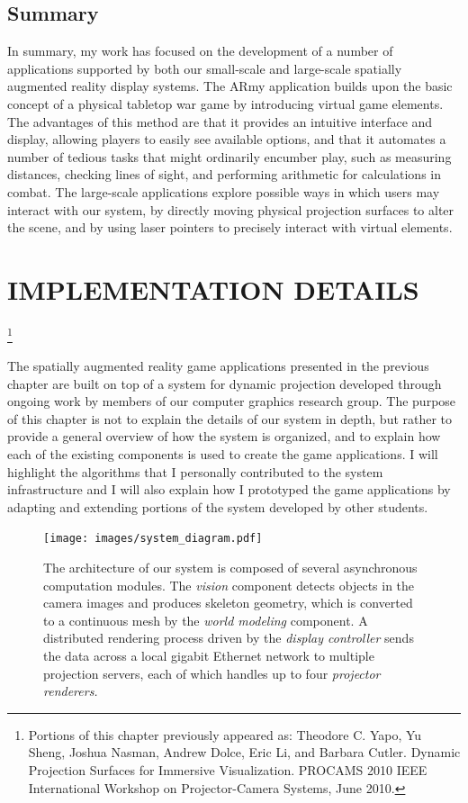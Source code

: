 \documentclass{thesis}
\begin{document}
\section{Summary}

In summary, my work has focused on the development of a number of applications supported by both our small-scale and large-scale spatially augmented reality display systems. The ARmy application builds upon the basic concept of a physical tabletop war game by introducing virtual game elements. The advantages of this method are that it provides an intuitive interface and display, allowing players to easily see available options, and that it automates a number of tedious tasks that might ordinarily encumber play, such as measuring distances, checking lines of sight, and performing arithmetic for calculations in combat. The large-scale applications explore possible ways in which users may interact with our system, by directly moving physical projection surfaces to alter the scene, and by using laser pointers to precisely interact with virtual elements.

\chapter{IMPLEMENTATION DETAILS }

\footnote{Portions of this chapter previously appeared as: Theodore C. Yapo, Yu Sheng, Joshua Nasman, Andrew Dolce, Eric Li, and Barbara Cutler. Dynamic Projection Surfaces for Immersive Visualization. PROCAMS 2010 IEEE International Workshop on Projector-Camera Systems, June 2010.}

The spatially augmented reality game applications presented in the previous chapter are built on top of a system for dynamic projection developed through ongoing work by members of our computer graphics research group. The purpose of this chapter is not to explain the details of our system in depth, but rather to provide a general overview of how the system is organized, and to explain how each of the existing components is used to create the game applications. I will highlight the algorithms that I personally contributed to the system infrastructure and I will also explain how I prototyped the game applications by adapting and extending portions of the system developed by other students.

\begin{figure}[t]
    \texttt{[image: images/system\_diagram.pdf]}%
    \caption[Overview of System Architecture]{
%
The architecture of our system is composed of several asynchronous
computation modules. The \emph{vision} component detects objects in the camera images and produces skeleton geometry, which is converted to a continuous mesh by the \emph{world modeling} component. A distributed rendering process driven by the \emph{display controller} sends the data across a local gigabit Ethernet network to multiple projection servers, each of which handles up to four \emph{projector renderers.}}
\vspace{-0.15in}
\label{FIGURE:block_diagram}
\end{figure}
\end{document}
